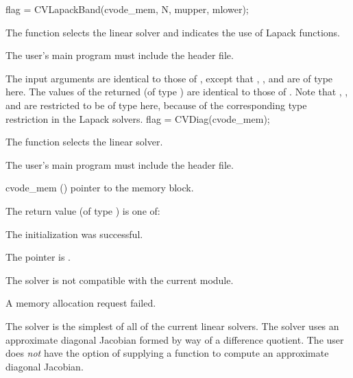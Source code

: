 {
  flag = CVLapackBand(cvode\_mem, N, mupper, mlower);
}
{
  The function  selects the {\cvband} linear solver and
  indicates the use of Lapack functions. 

  The user's main program must include the  header file.
}
{
  The input arguments are identical to those of , except
  that , , and  are of type  here.
}
{
  The values of the returned  (of type ) are identical
  to those of .
}
{
  Note that , , and  are restricted to be of type 
  here, because of the corresponding type restriction in the Lapack solvers.
}
{
  flag = CVDiag(cvode\_mem);
}
{
  The function  selects the {\cvdiag} linear solver. 

  The user's main program must include the  header file.
}
{
  \begin{args}
  \item[cvode\_mem] ()
    pointer to the {\cvodes} memory block.
  \end{args}
}
{
  The return value  (of type ) is one of:
  \begin{args}
  \item[\Id{CVDIAG\_SUCCESS}]
    The {\cvdiag} initialization was successful.
  \item[\Id{CVDIAG\_MEM\_NULL}]
    The  pointer is .
  \item[\Id{CVDIAG\_ILL\_INPUT}]
    The {\cvdiag} solver is not compatible with the current {\nvector} module.
  \item[\Id{CVDIAG\_MEM\_FAIL}]
    A memory allocation request failed.
  \end{args}
}
{
  The {\cvdiag} solver is the simplest of all of the current {\cvodes} linear solvers. 
  The {\cvdiag} solver uses an approximate diagonal Jacobian formed by way of a
  difference quotient. The user does {\em not} have the option of supplying a
  function to compute an approximate diagonal Jacobian.
}
